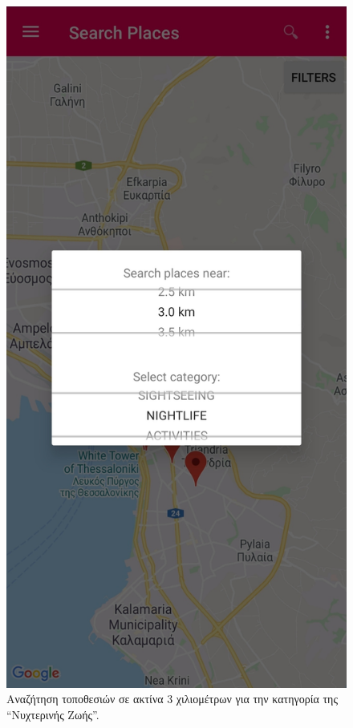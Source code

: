 \documentclass[oneside, 12pt]{book}
\begin{document}
\begin{figure}[h]
  \centering
  \includegraphics[scale=0.15]{images/search_places.jpg}
  \caption{\label{fig:search_places_1}Αναζήτηση τοποθεσιών σε ακτίνα 3 χιλιομέτρων για την κατηγορία της ``Νυχτερινής Ζωής''.}
\end{figure}
\end{document}
